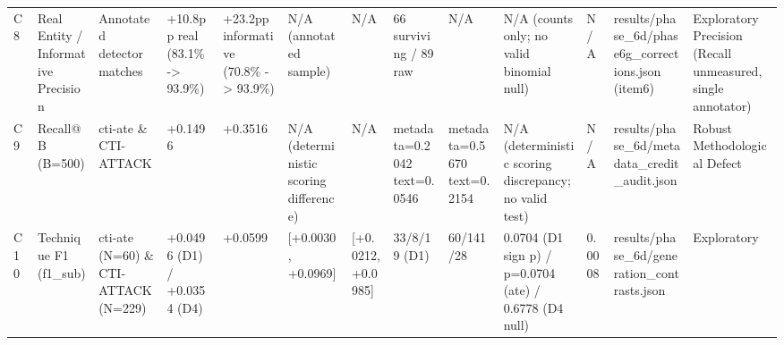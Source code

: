\begin{tabular}{lllllllllllll}
C8 & Real Entity / Informative Precision & Annotated detector matches & +10.8pp real (83.1\% -> 93.9\%) & +23.2pp informative (70.8\% -> 93.9\%) & N/A (annotated sample) & N/A & 66 surviving / 89 raw & N/A & N/A (counts only; no valid binomial null) & N/A & results/phase\_6d/phase6g\_corrections.json (item6) & Exploratory Precision (Recall unmeasured, single annotator) \\
C9 & Recall@B (B=500) & cti-ate \& CTI-ATTACK & +0.1496 & +0.3516 & N/A (deterministic scoring difference) & N/A & metadata=0.2042 text=0.0546 & metadata=0.5670 text=0.2154 & N/A (deterministic scoring discrepancy; no valid test) & N/A & results/phase\_6d/metadata\_credit\_audit.json & Robust Methodological Defect \\
C10 & Technique F1 (f1\_sub) & cti-ate (N=60) \& CTI-ATTACK (N=229) & +0.0496 (D1) / +0.0354 (D4) & +0.0599 & [+0.0030, +0.0969] & [+0.0212, +0.0985] & 33/8/19 (D1) & 60/141/28 & 0.0704 (D1 sign p) / p=0.0704 (ate) / 0.6778 (D4 null) & 0.0008 & results/phase\_6d/generation\_contrasts.json & Exploratory \\
\bottomrule
\end{tabular}
